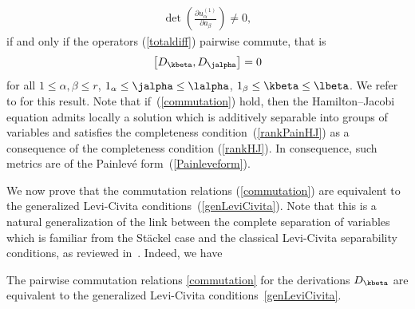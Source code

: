 \begin{gather}\label{rankHJ}
\det\left(\frac{\partial u^{(1)}_{\alpha}}{\partial a_{\beta}}\right)\neq 0,
\end{gather}
if and only if the operators (\ref{totaldiff}) pairwise commute, that is
\begin{gather}\label{commutation}
\big[D_{\kbeta},D_{\jalpha}\big]=0
\end{gather}
for all $1\leq \alpha, \beta \leq r$, $1_{\alpha}\leq \jalpha\leq \lalpha$, $1_{\beta}\leq \kbeta\leq \lbeta$. We refer to \cite[Theorem~2.1]{BCR1-2002} for this result. Note that if~(\ref{commutation}) hold, then the Hamilton--Jacobi equation admits locally a solution which is additively separable into groups of variables and satisfies the completeness condition~(\ref{rankPainHJ}) as a consequence of the completeness condition (\ref{rankHJ}). In consequence, such metrics are of the Painlev\'e form~(\ref{Painleveform}).

We now prove that the commutation relations (\ref{commutation}) are equivalent to the generalized Levi-Civita conditions~(\ref{genLeviCivita}). Note that this is a natural generalization of the link between the complete separation of variables which is familiar from the St\"ackel case and the classical Levi-Civita separability conditions, as reviewed in~\cite{BCR1-2002,KaMi1984}. Indeed, we have
\begin{Lemma}
The pairwise commutation relations \eqref{commutation} for the derivations $D_{\kbeta}$ are equivalent to the generalized Levi-Civita conditions~\eqref{genLeviCivita}.
\end{Lemma}

